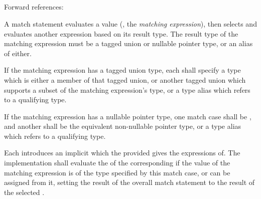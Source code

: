 
\begin{grammar}
 \\
	 \terminal{(}  \terminal{)} \terminal{\{}  \terminal{\}} \\

 \\
	 \terminal{;} \\
	 \terminal{;}  \\

 \\
	   \terminal{:}  \terminal{=>}  \\
	  \terminal{=>}  \\
	 \terminal{=>}  \\
\end{grammar}

Forward references: 

\specsubsubitem
A match statement evaluates a value (, the
\textit{matching expression}), then selects and evaluates another expression
based on its result type. The result type of the matching expression must be a
tagged union or nullable pointer type, or an alias of either.

\specsubsubitem
If the matching expression has a tagged union type, each
 shall specify a type which is either a member of that
tagged union, or another tagged union which supports a subset of the matching
expression's type, or a type alias which refers to a qualifying type.

\specsubsubitem
If the matching expression has a nullable pointer type, one match case shall be
, and another shall be the equivalent non-nullable pointer type,
or a type alias which refers to a qualifying type.

\specsubsubitem
Each  introduces an implicit
 which the provided
 gives the expressions of. The implementation
shall evaluate the  of the corresponding
 if the value of the matching expression is of the type
specified by this match case, or can be assigned from it, setting the result of
the overall match statement to the result of the selected
.

